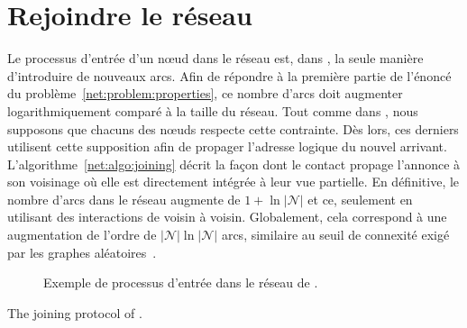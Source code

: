 \section{Rejoindre le réseau}
\label{net:sec:joining}

Le processus d'entrée d'un nœud dans le réseau est, dans \SPRAY, la seule
manière d'introduire de nouveaux arcs. Afin de répondre à la première partie de
l'énoncé du problème~\ref{net:problem:properties}, ce nombre d'arcs doit
augmenter logarithmiquement comparé à la taille du réseau. Tout comme dans
\SCAMP, nous supposons que chacuns des nœuds respecte cette contrainte. Dès
lors, ces derniers utilisent cette supposition afin de propager l'adresse
logique du nouvel arrivant. L'algorithme~\ref{net:algo:joining} décrit la façon
dont le contact propage l'annonce à son voisinage où elle est directement
intégrée à leur vue partielle. En définitive, le nombre d'arcs dans le réseau
augmente de $1 + \ln |\mathcal{N}|$ et ce, seulement en utilisant des
interactions de voisin à voisin. Globalement, cela correspond à une augmentation
de l'ordre de $|\mathcal{N}| \ln |\mathcal{N}|$ arcs, similaire au seuil de
connexité exigé par les graphes aléatoires~\cite{erdos1959random}.

\begin{figure*}
  \centering
  \hspace{40pt}
  \hspace{10pt}
  \caption{\label{net:fig:joiningexample} Exemple de processus d'entrée dans
    le réseau de \SPRAY.}
\end{figure*}

\begin{algorithm}[h]

\caption{\label{net:algo:joining}The joining protocol of \SPRAY.}
\end{algorithm}

